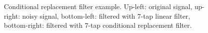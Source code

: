 \documentclass[smallabstract,smallcaptions]{dccpaper}
\begin{document}
\begin{figure}

\caption{Conditional replacement filter example. Up-left: original signal,
up-right: noisy signal, bottom-left: filtered with 7-tap linear filter,
bottom-right: filtered with 7-tap conditional replacement filter.
\label{fig:Conditional-filter-example}}
\end{figure}
\end{document}
